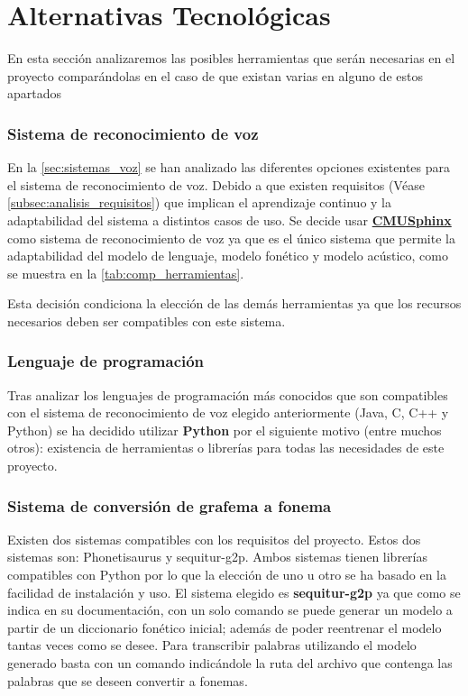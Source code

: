 \documentclass[../main.tex]{subfiles}
\begin{document}
\section{Alternativas Tecnológicas}

En esta sección analizaremos las posibles herramientas que serán necesarias en el proyecto comparándolas en el caso de que existan varias en alguno de estos apartados

\subsubsection{Sistema de reconocimiento de voz}\label{subsub:at-cmu}
En la \autoref{sec:sistemas_voz} se han analizado las diferentes opciones existentes para el sistema de reconocimiento de voz. Debido a que existen requisitos (Véase \autoref{subsec:analisis_requisitos}) que implican el aprendizaje continuo y la adaptabilidad del sistema a distintos casos de uso. Se decide usar \hyperref[par:cmusphinx]{\textbf{CMUSphinx}}\cite{} como sistema de reconocimiento de voz ya que es el único sistema que permite la adaptabilidad del modelo de lenguaje, modelo fonético y modelo acústico, como se muestra en la \autoref{tab:comp_herramientas}. 

Esta decisión condiciona la elección de las demás herramientas ya que los recursos necesarios deben ser compatibles con este sistema.

\subsubsection{Lenguaje de programación}\label{subsub:at-python}
Tras analizar los lenguajes de programación más conocidos que son compatibles con el sistema de reconocimiento de voz elegido anteriormente (Java, C, C++ y Python) se ha decidido utilizar \textbf{Python} por el siguiente motivo (entre muchos otros): existencia de herramientas o librerías para todas las necesidades de este proyecto. 

\subsubsection{Sistema de conversión de grafema a fonema}\label{subsub:at-g2p}
Existen dos sistemas compatibles con los requisitos del proyecto. Estos dos sistemas son: Phonetisaurus\cite{} y sequitur-g2p\cite{}. Ambos sistemas tienen librerías compatibles con Python por lo que la elección de uno u otro se ha basado en la facilidad de instalación y uso. El sistema elegido es \textbf{sequitur-g2p} ya que como se indica en su documentación, con un solo comando se puede generar un modelo a partir de un diccionario fonético inicial; además de poder reentrenar el modelo tantas veces como se desee. Para transcribir palabras utilizando el modelo generado basta con un comando indicándole la ruta del archivo que contenga las palabras que se deseen convertir a fonemas.
\end{document}
